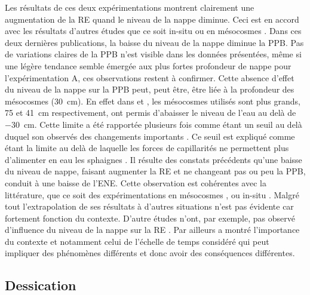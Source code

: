 Les résultats de ces deux expérimentations montrent clairement une augmentation de la RE quand le niveau de la nappe diminue.
Ceci est en accord avec les résultats d'autres études que ce soit in-situ \citep{ballantyne2014} ou en mésocosmes \citep{blodau2004,dinsmore2009}.
Dans ces deux dernières publications, la baisse du niveau de la nappe diminue la PPB.
Pas de variations claires de la PPB n'est visible dans les données présentées, même si une légère tendance semble émergée aux plus fortes profondeur de nappe pour l'expérimentation A, ces observations restent à confirmer.
Cette absence d'effet du niveau de la nappe sur la PPB peut, peut être, être liée à la profondeur des mésocosmes (\SI{30}{\centi\metre}).
En effet dans \citet{blodau2004} et \citet{dinsmore2009}, les mésocosmes utilisés sont plus grands, 75 et \SI{41}{\centi\metre} respectivement, ont permis d'abaisser le niveau de l'eau au delà de \SI{-30}{\centi\metre}.
Cette limite a été rapportée plusieurs fois comme étant un seuil au delà duquel son observés des changements importants \citep{blodau2004,peichl2014}.
Ce seuil est expliqué comme étant la limite au delà de laquelle les forces de capillarités ne permettent plus d'alimenter en eau les sphaignes \citep{rydin2013a,ketcheson2014}.
Il résulte des constats précédents qu'une baisse du niveau de nappe, faisant augmenter la RE et ne changeant pas ou peu la PPB, conduit à une baisse de l'ENE.
Cette observation est cohérentes avec la littérature, que ce soit des expérimentations en mésocosmes \plop, ou in-situ \plop.
Malgré tout l'extrapolation de ses résultats à d'autres situations n'est pas évidente car fortement fonction du contexte.
D'autre études n'ont, par exemple, pas observé d'influence du niveau de la nappe sur la RE \plop.
Par ailleurs \citet{laiho2006} a montré l'importance du contexte et notamment celui de l'échelle de temps considéré qui peut impliquer des phénomènes différents et donc avoir des conséquences différentes.



\subsection{Dessication}


